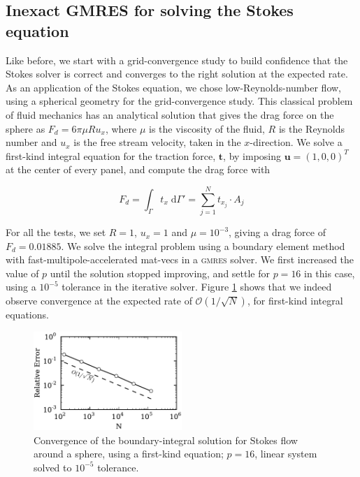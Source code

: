 \documentclass[final,leqno,]{siamltex1213}
\renewcommand{\O}[1]{\mathcal{O}(#1)}
\newcommand{\gmres}{\textsc{gmres}\xspace}
\newcommand{\di}[1]{\text{d}#1}
\newcommand{\vect}[1]{\mathbf{#1}}
\begin{document}
\subsection{Inexact {\small GMRES} for solving the Stokes equation}
Like before, we start with a grid-convergence study to build confidence that the Stokes solver is correct and converges to the right solution at the expected rate. As an application of the Stokes equation, we chose low-Reynolds-number flow, using a spherical geometry for the grid-convergence study. This classical problem of fluid mechanics has an analytical solution that gives the drag force on the sphere as $F_d = 6\pi\mu Ru_x$, where $\mu$ is the viscosity of the fluid, $R$ is the Reynolds number and $u_x$ is the free stream velocity, taken in the $x$-direction. We solve a first-kind integral equation for the traction force, $\vect{t}$, by imposing $\vect{u} = (1,0,0)^{T}$ at the center of every panel, and compute the drag force with

\begin{equation}
	\label{eqn:stokes_traction_drag}
	F_d = \int_\Gamma t_x\;\di{\Gamma'} = \sum_{j=1}^{N} t_{x_j}\cdot A_j
\end{equation}

For all the tests, we set $R=1$, $u_x = 1$ and $\mu = 10^{-3}$, giving a drag force of $F_d = 0.01885$. We solve the integral problem using a boundary element method with fast-multipole-accelerated mat-vecs in a \gmres solver. We first increased the value of $p$ until the solution stopped improving, and settle for $p=16$ in this case, using a $10^{-5}$ tolerance in the iterative solver.
Figure \ref{fig:stokes_convergence} shows that we indeed observe convergence at the expected rate of $\O{1 / \sqrt{N}}$, for first-kind integral equations.

\begin{figure}[h]
\begin{center}
	\includegraphics[natwidth=3in,natheight=2in,width=0.5\textwidth]{StokesConvergence.pdf}
	\caption{Convergence of the boundary-integral solution for Stokes flow around a sphere, using a  first-kind equation; $p=16$, linear system solved to $10^{-5}$ tolerance.}
	\label{fig:stokes_convergence}
\end{center}
\end{figure}
\end{document}
